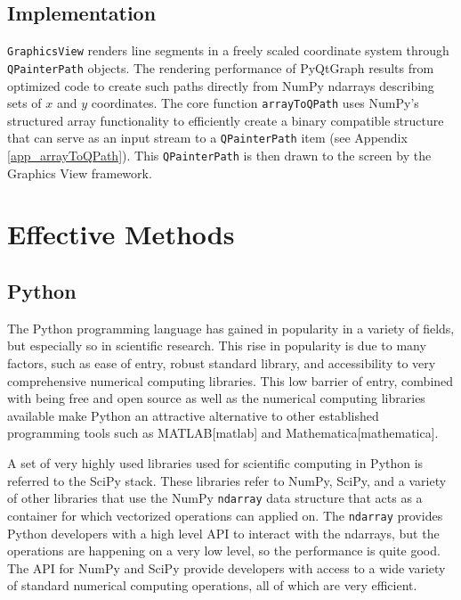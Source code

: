 \documentclass[journal]{vgtc}                %
\begin{document}
\subsection{Implementation}
\texttt{GraphicsView} renders line segments in a freely scaled coordinate system through \texttt{QPainterPath} objects. The rendering performance of PyQtGraph results from optimized code to create such paths directly from NumPy ndarrays describing sets of $x$ and $y$ coordinates. The core function \texttt{arrayToQPath} uses NumPy's structured array functionality to efficiently create a binary compatible structure that can serve as an input stream to a \texttt{QPainterPath} item (see Appendix \ref{app_arrayToQPath}). This \texttt{QPainterPath} is then drawn to the screen by the Graphics View framework.


\color{brown}
\section{Effective Methods}
\subsection{Python}



The Python programming language has gained in popularity in a variety of fields, but especially so in scientific research.  This rise in popularity is due to many factors, such as ease of entry, robust standard library, and accessibility to very comprehensive numerical computing libraries.  This low barrier of entry, combined with being free and open source as well as the numerical computing libraries available make Python an attractive alternative to other established programming tools such as MATLAB[matlab] and Mathematica[mathematica].  

A set of very highly used libraries used for scientific computing in Python is referred to the SciPy stack.  These libraries refer to NumPy, SciPy, and a variety of other libraries that use the NumPy \texttt{ndarray} data structure that acts as a container for which vectorized operations can applied on.  The \texttt{ndarray} provides Python developers with a high level API to interact with the ndarrays, but the operations are happening on a very low level, so the performance is quite good.  The API for NumPy and SciPy provide developers with access to a wide variety of standard numerical computing operations, all of which are very efficient.
\end{document}
